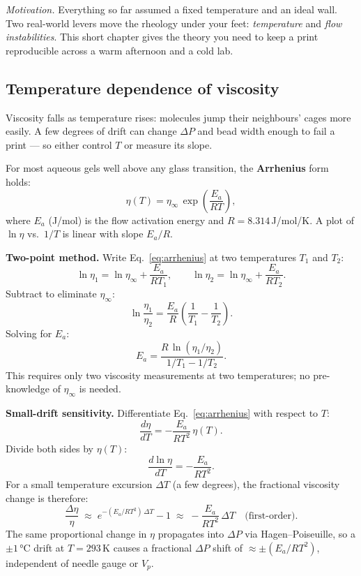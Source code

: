\documentclass[11pt,a4paper]{article}
\begin{document}
\emph{Motivation.} Everything so far assumed a fixed temperature and an ideal wall. Two
real-world levers move the rheology under your feet: \emph{temperature}
and \emph{flow instabilities}. This short chapter gives the theory you
need to keep a print reproducible across a warm afternoon and a cold lab.

\subsection{Temperature dependence of viscosity}
\begin{intuitionbox}
Viscosity falls as temperature rises: molecules jump their neighbours'
cages more easily. A few degrees of drift can change $\Delta P$ and bead
width enough to fail a print --- so either control $T$ or measure its
slope.
\end{intuitionbox}

For most aqueous gels well above any glass transition, the
\textbf{Arrhenius} form holds:
\begin{equation}
\eta(T)=\eta_\infty\,\exp\!\left(\frac{E_a}{RT}\right),
\label{eq:arrhenius}
\end{equation}
where $E_a$ (\si{\J/\mol}) is the flow activation energy and
$R=8.314$\,\si{\J/\mol/\K}. A plot of $\ln\eta$ vs.\ $1/T$ is linear
with slope $E_a/R$.

\begin{derivationbox}[title={DERIVATION --- Arrhenius: two-point method and small-$\Delta T$ sensitivity}]

\textbf{Two-point method.}
Write Eq.~\ref{eq:arrhenius} at two temperatures $T_1$ and $T_2$:
\[
  \ln\eta_1 = \ln\eta_\infty + \frac{E_a}{RT_1}, \qquad
  \ln\eta_2 = \ln\eta_\infty + \frac{E_a}{RT_2}.
\]
Subtract to eliminate $\eta_\infty$:
\[
  \ln\frac{\eta_1}{\eta_2}
    = \frac{E_a}{R}\!\left(\frac{1}{T_1}-\frac{1}{T_2}\right).
\]
Solving for $E_a$:
\begin{equation}
E_a
  = \frac{R\,\ln(\eta_1/\eta_2)}{1/T_1 - 1/T_2}.
\label{eq:ea_twopoint}
\end{equation}
This requires only two viscosity measurements at two temperatures;
no pre-knowledge of $\eta_\infty$ is needed.

\medskip\noindent\textbf{Small-drift sensitivity.}
Differentiate Eq.~\ref{eq:arrhenius} with respect to $T$:
\[
  \frac{d\eta}{dT} = -\frac{E_a}{RT^2}\,\eta(T).
\]
Divide both sides by $\eta(T)$:
\[
  \frac{d\ln\eta}{dT} = -\frac{E_a}{RT^2}.
\]
For a small temperature excursion $\Delta T$ (a few degrees), the
fractional viscosity change is therefore:
\begin{equation}
\frac{\Delta\eta}{\eta}
  \;\approx\; e^{-(E_a/RT^2)\,\Delta T} - 1
  \;\approx\; -\frac{E_a}{RT^2}\,\Delta T
  \quad\text{(first-order)}.
\label{eq:arrhenius_sensitivity}
\end{equation}
The same proportional change in $\eta$ propagates into $\Delta P$ via
Hagen--Poiseuille, so a $\pm1\,\si{\celsius}$ drift at
$T=293\,\si{\K}$ causes a fractional $\Delta P$ shift of
$\approx\pm(E_a/RT^2)$, independent of needle gauge or $V_p$.
\end{derivationbox}
\end{document}
